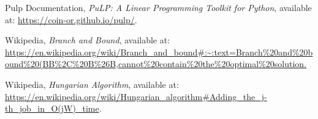 \begin{thebibliography}{9}
Pulp Documentation, \emph{PuLP: A Linear Programming Toolkit for Python}, available at: 
\url{https://coin-or.github.io/pulp/}.

Wikipedia, \emph{Branch and Bound}, available at: 
\url{https://en.wikipedia.org/wiki/Branch_and_bound#:~:text=Branch%20and%20bound%20(BB%2C%20B%26B,cannot%20contain%20the%20optimal%20solution.}

Wikipedia, \emph{Hungarian Algorithm}, available at: 
\url{https://en.wikipedia.org/wiki/Hungarian_algorithm#Adding_the_j-th_job_in_O(jW)_time}.

\end{thebibliography}

